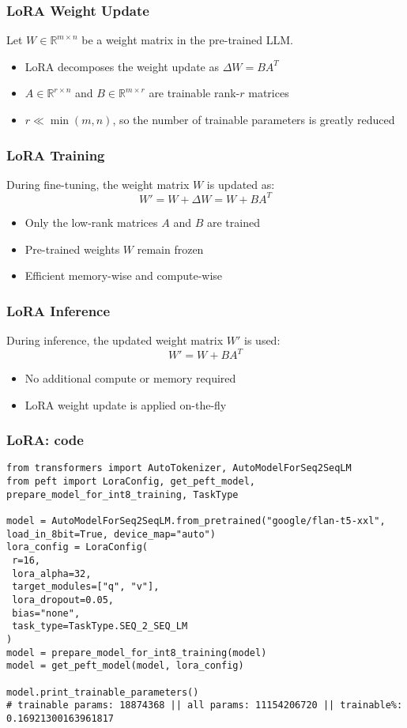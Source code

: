 \begin{frame}[fragile]\frametitle{LoRA Weight Update}
Let $W \in \mathbb{R}^{m \times n}$ be a weight matrix in the pre-trained LLM.
\begin{itemize}
    \item LoRA decomposes the weight update as $\Delta W = BA^T$
    \item $A \in \mathbb{R}^{r \times n}$ and $B \in \mathbb{R}^{m \times r}$ are trainable rank-$r$ matrices
    \item $r \ll \min(m, n)$, so the number of trainable parameters is greatly reduced
\end{itemize}
\end{frame}

\begin{frame}[fragile]\frametitle{LoRA Training}
During fine-tuning, the weight matrix $W$ is updated as:
$$W' = W + \Delta W = W + BA^T$$
\begin{itemize}
    \item Only the low-rank matrices $A$ and $B$ are trained
    \item Pre-trained weights $W$ remain frozen
    \item Efficient memory-wise and compute-wise
\end{itemize}
\end{frame}

\begin{frame}[fragile]\frametitle{LoRA Inference}
During inference, the updated weight matrix $W'$ is used:
$$W' = W + BA^T$$
\begin{itemize}
    \item No additional compute or memory required
    \item LoRA weight update is applied on-the-fly
\end{itemize}
\end{frame}


\begin{frame}[fragile]\frametitle{LoRA: code}
\begin{lstlisting}
from transformers import AutoTokenizer, AutoModelForSeq2SeqLM
from peft import LoraConfig, get_peft_model, prepare_model_for_int8_training, TaskType

model = AutoModelForSeq2SeqLM.from_pretrained("google/flan-t5-xxl", load_in_8bit=True, device_map="auto")
lora_config = LoraConfig(
 r=16,
 lora_alpha=32,
 target_modules=["q", "v"],
 lora_dropout=0.05,
 bias="none",
 task_type=TaskType.SEQ_2_SEQ_LM
)
model = prepare_model_for_int8_training(model)
model = get_peft_model(model, lora_config)

model.print_trainable_parameters()
# trainable params: 18874368 || all params: 11154206720 || trainable%: 0.16921300163961817
\end{lstlisting}
\end{frame}

